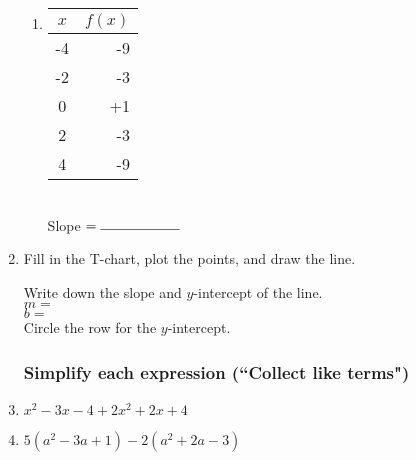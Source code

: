\documentclass[12pt, oneside]{article}
\begin{document}
\begin{enumerate}
\begin{multicols}{2}
\begin{enumerate}
      \item
        \begin{tabular}{|c|r|}
          \hline
          $x$ & $f(x)$\\
          \hline
          -4 & -9 \\
          \hline
          -2 & -3 \\
          \hline
          0 & +1 \\
          \hline
          2 & -3 \\
          \hline
          4 & -9 \\
          \hline
        \end{tabular}\\[0.85cm]

        Slope $= \rule{2cm}{0.15mm}$\\

      \end{enumerate}
    \end{multicols}

\newpage


\item Fill in the T-chart, plot the points, and draw the line.

    \begin{center} %
    \end{center}
Write down the slope and $y$-intercept of the line.\\[0.5cm]
$m=$\\[0.5cm]
$b=$\\[0.5cm]
Circle the row for the $y$-intercept.


\subsubsection*{Simplify each expression (``Collect like terms")}
  \item $x^2-3x -4 +2x^2+2x+4$ \vspace{1.5cm}
  \item $5(a^2-3a +1) -2(a^2+2a-3)$ \vspace{3cm}


\end{enumerate}
\end{document}
